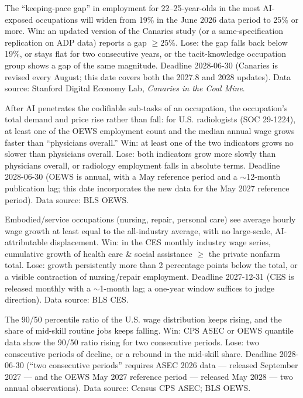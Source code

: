 \documentclass[11pt]{article}
\begin{document}
\begin{description}[leftmargin=2.2em,style=nextline]
\item[Assertion 1 (Widening youth employment gap in codified knowledge, confidence 60\%)]
The ``keeping-pace gap'' in employment for 22--25-year-olds in the most AI-exposed occupations will widen from 19\% in the June 2026 data period to 25\% or more. Win: an updated version of the Canaries study (or a same-specification replication on ADP data) reports a gap $\geq 25\%$. Lose: the gap falls back below 19\%, or stays flat for two consecutive years, or the tacit-knowledge occupation group shows a gap of the same magnitude. Deadline 2028-06-30 (Canaries is revised every August; this date covers both the 2027.8 and 2028 updates). Data source: Stanford Digital Economy Lab, \textit{Canaries in the Coal Mine}.
\item[Assertion 2 (Barrier components turn ``expensive'': the radiology pattern repeats, confidence 70\%)]
After AI penetrates the codifiable sub-tasks of an occupation, the occupation's total demand and price rise rather than fall: for U.S. radiologists (SOC 29-1224), at least one of the OEWS employment count and the median annual wage grows faster than ``physicians overall.'' Win: at least one of the two indicators grows no slower than physicians overall. Lose: both indicators grow more slowly than physicians overall, or radiology employment falls in absolute terms. Deadline 2028-06-30 (OEWS is annual, with a May reference period and a $\sim$12-month publication lag; this date incorporates the new data for the May 2027 reference period). Data source: BLS OEWS.
\item[Assertion 3 (AI sweeps only Class-1 barriers, confidence 60\%)]
Embodied/service occupations (nursing, repair, personal care) see average hourly wage growth at least equal to the all-industry average, with no large-scale, AI-attributable displacement. Win: in the CES monthly industry wage series, cumulative growth of health care \& social assistance $\geq$ the private nonfarm total. Lose: growth persistently more than 2 percentage points below the total, or a visible contraction of nursing/repair employment. Deadline 2027-12-31 (CES is released monthly with a $\sim$1-month lag; a one-year window suffices to judge direction). Data source: BLS CES.
\item[Assertion 4 (The hollowing of the middle deepens, confidence 65\%)]
The 90/50 percentile ratio of the U.S. wage distribution keeps rising, and the share of mid-skill routine jobs keeps falling. Win: CPS ASEC or OEWS quantile data show the 90/50 ratio rising for two consecutive periods. Lose: two consecutive periods of decline, or a rebound in the mid-skill share. Deadline 2028-06-30 (``two consecutive periods'' requires ASEC 2026 data --- released September 2027 --- and the OEWS May 2027 reference period --- released May 2028 --- two annual observations). Data source: Census CPS ASEC; BLS OEWS.

\end{description}
\end{document}
